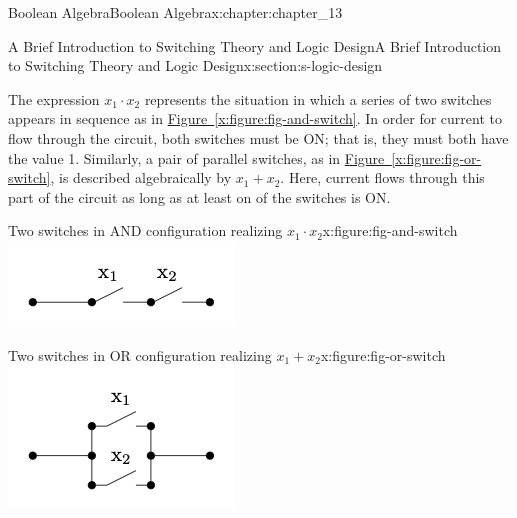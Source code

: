 \documentclass[oneside,10pt,]{book}
\newcommand{\xreffont}{\relax}
\numberwithin{equation}{section}
\begin{document}
\begin{chapterptx}{Boolean Algebra}{}{Boolean Algebra}{}{}{x:chapter:chapter_13}
\begin{sectionptx}{A Brief Introduction to Switching Theory and Logic Design}{}{A Brief Introduction to Switching Theory and Logic Design}{}{}{x:section:s-logic-design}
\par
The expression \(x_1 \cdot  x_2\) represents the situation in which a series of two switches appears in sequence as in \hyperref[x:figure:fig-and-switch]{Figure~{\xreffont\ref{x:figure:fig-and-switch}}}. In order for current to flow through the circuit, both switches must be ON; that is, they must both have the value 1.  Similarly, a pair of parallel switches, as in \hyperref[x:figure:fig-or-switch]{Figure~{\xreffont\ref{x:figure:fig-or-switch}}}, is described algebraically by \(x_1 + x_2\). Here, current flows through this part of the circuit as long as at least on of the switches is ON.%
\begin{sidebyside}{2}{0}{0}{0}%
\begin{sbspanel}{0.5}%
\begin{figureptx}{Two switches in AND configuration realizing \(x_1 \cdot x_2\)}{x:figure:fig-and-switch}{}%
\includegraphics[width=\linewidth]{images/fig-and-switch.png}
\tcblower
\end{figureptx}%
\end{sbspanel}%
\begin{sbspanel}{0.5}%
\begin{figureptx}{Two switches in OR configuration realizing \(x_1 + x_2\)}{x:figure:fig-or-switch}{}%
\includegraphics[width=\linewidth]{images/fig-or-switch.png}

\end{figureptx}
\end{sbspanel}
\end{sidebyside}
\end{sectionptx}
\end{chapterptx}
\end{document}
